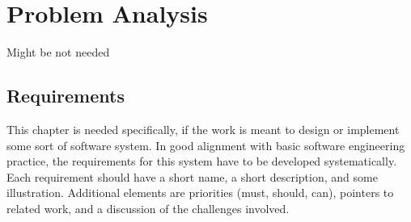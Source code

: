 \chapter{Problem Analysis}
\label{Problem Analysis}

Might be not needed

\section{Requirements}

This chapter is needed specifically, if the work is meant to design or implement some sort of software system. In good alignment with basic software engineering practice, the requirements for this system have to be developed systematically. Each requirement should have a short name, a short description, and some illustration. Additional elements are priorities (must, should, can), pointers to related work, and a discussion of the challenges involved.